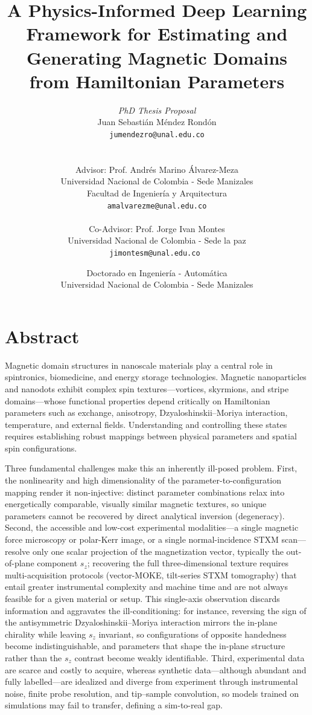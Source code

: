 \documentclass[letterpaper, 12, one column]{article}
\title{A Physics-Informed Deep Learning Framework for Estimating and Generating Magnetic Domains from Hamiltonian Parameters}
\author{\emph{PhD Thesis Proposal}\\ Juan Sebastián Méndez Rondón \\ \texttt{\small jumendezro@unal.edu.co} \\ \\ \\ 
Advisor: Prof. Andr\'es Marino \'Alvarez-Meza \\ \small{Universidad Nacional de Colombia - Sede Manizales} \\ \small{Facultad de Ingenier\'ia y Arquitectura} \\ \texttt{\scriptsize   amalvarezme@unal.edu.co} 
\\ \\ 
Co-Advisor: Prof. Jorge Ivan Montes\\ \small{Universidad Nacional de Colombia - Sede la paz}  \\ \texttt{\scriptsize  jimontesm@unal.edu.co } }
\date{Doctorado en Ingenier\'ia - Autom\'atica \\ Universidad Nacional de Colombia - Sede Manizales}
\begin{document}
\maketitle
\section{Abstract}

Magnetic domain structures in nanoscale materials play a central role in spintronics, biomedicine, and energy storage technologies. Magnetic nanoparticles and nanodots exhibit complex spin textures—vortices, skyrmions, and stripe domains—whose functional properties depend critically on Hamiltonian parameters such as exchange, anisotropy, Dzyaloshinskii–Moriya interaction, temperature, and external fields. Understanding and controlling these states requires establishing robust mappings between physical parameters and spatial spin configurations.

Three fundamental challenges make this an inherently ill-posed problem. First, the nonlinearity and high dimensionality of the parameter-to-configuration mapping render it non-injective: distinct parameter combinations relax into energetically comparable, visually similar magnetic textures, so unique parameters cannot be recovered by direct analytical inversion (degeneracy). Second, the accessible and low-cost experimental modalities—a single magnetic force microscopy or polar-Kerr image, or a single normal-incidence STXM scan—resolve only one scalar projection of the magnetization vector, typically the out-of-plane component $s_z$; recovering the full three-dimensional texture requires multi-acquisition protocols (vector-MOKE, tilt-series STXM tomography) that entail greater instrumental complexity and machine time and are not always feasible for a given material or setup. This single-axis observation discards information and aggravates the ill-conditioning: for instance, reversing the sign of the antisymmetric Dzyaloshinskii–Moriya interaction mirrors the in-plane chirality while leaving $s_z$ invariant, so configurations of opposite handedness become indistinguishable, and parameters that shape the in-plane structure rather than the $s_z$ contrast become weakly identifiable. Third, experimental data are scarce and costly to acquire, whereas synthetic data—although abundant and fully labelled—are idealized and diverge from experiment through instrumental noise, finite probe resolution, and tip–sample convolution, so models trained on simulations may fail to transfer, defining a sim-to-real gap.
\end{document}
